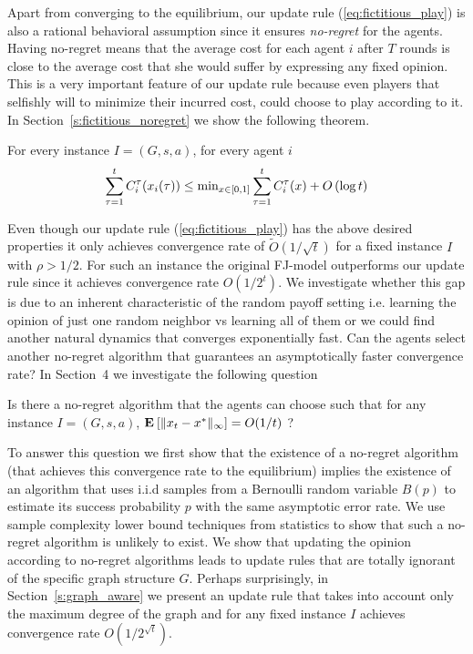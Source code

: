 Apart from converging to the equilibrium, our update rule
(\ref{eq:fictitious_play}) is also a rational behavioral
assumption since it ensures \emph{no-regret} for the agents.
Having no-regret means that the average cost for each agent $i$
after $T$ rounds is close to the average cost that she would
suffer by expressing any fixed opinion. This is a very important
feature of our update rule because even players that selfishly
will to minimize their incurred cost, could choose to play according
to it. In Section~\ref{s:fictitious_noregret} we show the following
theorem.
\begin{theorem}\label{t:fictitious_noregret}

  For every instance $I=(G,s,a)$, for every agent $i$
  $$\sum_{\tau=1}^tC_i^\tau(x_i(\tau)) \leq \text{min}_{x \in
    [0,1]}\sum_{\tau=1}^tC_i^\tau(x) + O\left(\log t\right)$$

\end{theorem}

Even though our update rule (\ref{eq:fictitious_play}) has the above
desired properties it only achieves convergence rate of
$\widetilde{O}(1/\sqrt{t})$ for a fixed instance $I$ with
$\rho>1/2$.  For such an instance the original FJ-model outperforms
our update rule since it achieves convergence rate $O(1/2^{t})$.
We investigate whether this gap is due to an inherent characteristic
of the random payoff setting i.e. learning the opinion of just one random
neighbor vs learning all of them or we could find another natural dynamics
that converges exponentially fast. Can the agents select another no-regret
algorithm that guarantees an asymptotically faster convergence rate?
In Section~4 we investigate the following question

\begin{question}
  Is there a no-regret algorithm that the agents can choose such that
  for any instance $I = (G, s, a)$, $\Exp{\norm{\infty}{x_t - x^*}} = O(1/t)$ ?
\end{question}

To answer this question we first show that the existence of a no-regret
algorithm (that achieves this convergence rate to the equilibrium) implies
the existence of an algorithm that uses i.i.d samples from a Bernoulli random
variable $B(p)$ to estimate its success probability $p$ with the same asymptotic
error rate. We use sample complexity lower bound techniques from statistics
to show that such a no-regret algorithm is unlikely to exist.
We show that updating the opinion according to no-regret algorithms leads
to update rules that are totally ignorant of the specific graph structure $G$.
Perhaps surprisingly, in Section~\ref{s:graph_aware} we present an update rule
that takes into account only the maximum degree of the graph and for any
fixed instance $I$ achieves convergence rate $O(1/2^{\sqrt{t}})$.


